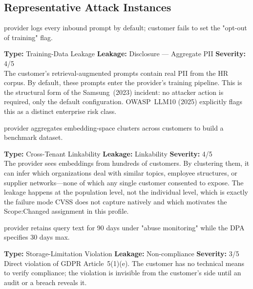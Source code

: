 \documentclass[a4paper,12pt]{report}
\begin{document}
\subsection{Representative Attack Instances}

\vspace{4pt}
\begin{attackbox}
  provider logs every inbound prompt by default;
        customer fails to set the "opt-out of training" flag.
\end{attackbox}
\begin{prosebox}
\small\textbf{Type:} Training-Data Leakage \quad
\textbf{Leakage:} Disclosure --- Aggregate PII \quad \textbf{Severity:} 4/5\\[2pt]
The customer's retrieval-augmented prompts contain real PII from the HR
corpus. By default, these prompts enter the provider's training pipeline.
This is the structural form of the Samsung~(2023) incident: no attacker
action is required, only the default configuration. OWASP~LLM10 (2025)
explicitly flags this as a distinct enterprise risk class.
\end{prosebox}

\vspace{4pt}
\begin{attackbox}
  provider aggregates embedding-space
        clusters across customers to build a benchmark dataset.
\end{attackbox}
\begin{prosebox}
\small\textbf{Type:} Cross-Tenant Linkability \quad
\textbf{Leakage:} Linkability \quad \textbf{Severity:} 4/5\\[2pt]
The provider sees embeddings from hundreds of customers. By clustering
them, it can infer which organizations deal with similar topics, employee
structures, or supplier networks---none of which any single customer
consented to expose. The leakage happens at the population level, not
the individual level, which is exactly the failure mode CVSS does not
capture natively and which motivates the Scope:Changed assignment
in this profile.
\end{prosebox}

\vspace{4pt}
\begin{attackbox}
  provider retains query text for 90 days
        under "abuse monitoring" while the DPA specifies 30 days max.
\end{attackbox}
\begin{prosebox}
\small\textbf{Type:} Storage-Limitation Violation \quad
\textbf{Leakage:} Non-compliance \quad \textbf{Severity:} 3/5\\[2pt]
Direct violation of GDPR Article~5(1)(e). The customer has no technical
means to verify compliance; the violation is invisible from the customer's
side until an audit or a breach reveals it.
\end{prosebox}
\end{document}

